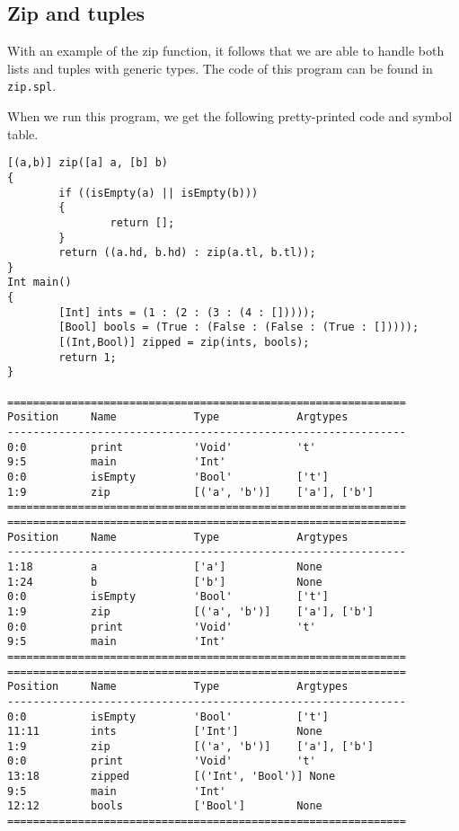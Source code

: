 \documentclass[a4paper]{article}
\begin{document}
\subsection{Zip and tuples}
With an example of the zip function, it follows that we are able to handle both lists and tuples with generic types. The code of this program can be found in {\tt zip.spl}. 


When we run this program, we get the following pretty-printed code and symbol table.
\begin{verbatim}
[(a,b)] zip([a] a, [b] b)
{
        if ((isEmpty(a) || isEmpty(b)))
        {
                return [];
        }
        return ((a.hd, b.hd) : zip(a.tl, b.tl));
}
Int main()
{
        [Int] ints = (1 : (2 : (3 : (4 : []))));
        [Bool] bools = (True : (False : (False : (True : []))));
        [(Int,Bool)] zipped = zip(ints, bools);
        return 1;
}

==============================================================
Position     Name            Type            Argtypes            
--------------------------------------------------------------
0:0          print           'Void'          't'                 
9:5          main            'Int'                               
0:0          isEmpty         'Bool'          ['t']               
1:9          zip             [('a', 'b')]    ['a'], ['b']        
==============================================================
==============================================================
Position     Name            Type            Argtypes            
--------------------------------------------------------------
1:18         a               ['a']           None                
1:24         b               ['b']           None                
0:0          isEmpty         'Bool'          ['t']               
1:9          zip             [('a', 'b')]    ['a'], ['b']        
0:0          print           'Void'          't'                 
9:5          main            'Int'                               
==============================================================
==============================================================
Position     Name            Type            Argtypes            
--------------------------------------------------------------
0:0          isEmpty         'Bool'          ['t']               
11:11        ints            ['Int']         None                
1:9          zip             [('a', 'b')]    ['a'], ['b']        
0:0          print           'Void'          't'                 
13:18        zipped          [('Int', 'Bool')] None                
9:5          main            'Int'                               
12:12        bools           ['Bool']        None                
==============================================================
\end{verbatim}
\end{document}
